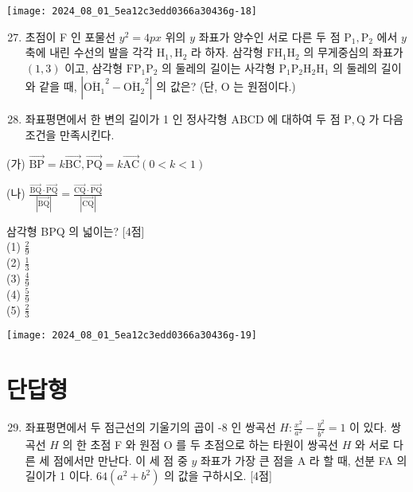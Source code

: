 \documentclass[10pt]{article}
\begin{document}
\begin{center}
\texttt{[image: 2024\_08\_01\_5ea12c3edd0366a30436g-18]}
\end{center}

\begin{enumerate}
  \setcounter{enumi}{26}
  \item 초점이 F 인 포물선 $y^{2}=4 p x$ 위의 $y$ 좌표가 양수인 서로 다른 두 점 $\mathrm{P}_{1}, \mathrm{P}_{2}$ 에서 $y$ 축에 내린 수선의 발을 각각 $\mathrm{H}_{1}, \mathrm{H}_{2}$ 라 하자. 삼각형 $\mathrm{FH}_{1} \mathrm{H}_{2}$ 의 무게중심의 좌표가 $(1,3)$ 이고, 삼각형 $\mathrm{FP}_{1} \mathrm{P}_{2}$ 의 둘레의 길이는 사각형 $\mathrm{P}_{1} \mathrm{P}_{2} \mathrm{H}_{2} \mathrm{H}_{1}$ 의 둘레의 길이와 같을 때, $\left|{\overline{\mathrm{OH}_{1}}}^{2}-{\overline{\mathrm{OH}_{2}}}^{2}\right|$ 의 값은? (단, O 는 원점이다.)
  \item 좌표평면에서 한 변의 길이가 1 인 정사각형 ABCD 에 대하여 두 점 $\mathrm{P}, \mathrm{Q}$ 가 다음 조건을 만족시킨다.
\end{enumerate}

(가) $\overrightarrow{\mathrm{BP}}=k \overrightarrow{\mathrm{BC}}, \overrightarrow{\mathrm{PQ}}=k \overrightarrow{\mathrm{AC}}(0<k<1)$

(나) $\frac{\overrightarrow{\mathrm{BQ}} \cdot \overrightarrow{\mathrm{PQ}}}{|\overrightarrow{\mathrm{BQ}}|}=\frac{\overrightarrow{\mathrm{CQ}} \cdot \overrightarrow{\mathrm{PQ}}}{|\overrightarrow{\mathrm{CQ}}|}$

삼각형 BPQ 의 넓이는? [4점]\\
(1) $\frac{2}{9}$\\
(2) $\frac{1}{3}$\\
(3) $\frac{4}{9}$\\
(4) $\frac{5}{9}$\\
(5) $\frac{2}{3}$

\begin{center}
\texttt{[image: 2024\_08\_01\_5ea12c3edd0366a30436g-19]}
\end{center}

\section*{단답형}
\begin{enumerate}
  \setcounter{enumi}{28}
  \item 좌표평면에서 두 점근선의 기울기의 곱이 -8 인 쌍곡선 $H: \frac{x^{2}}{a^{2}}-\frac{y^{2}}{b^{2}}=1$ 이 있다. 쌍곡선 $H$ 의 한 초점 F 와 원점 O 를 두 초점으로 하는 타원이 쌍곡선 $H$ 와 서로 다른 세 점에서만 만난다. 이 세 점 중 $y$ 좌표가 가장 큰 점을 A 라 할 때, 선분 FA 의 길이가 1 이다. $64\left(a^{2}+b^{2}\right)$ 의 값을 구하시오. [4점]
\end{enumerate}
\end{document}
